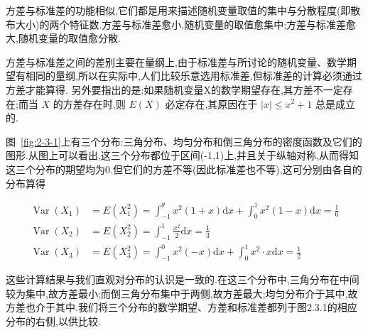 方差与标准差的功能相似,它们都是用来描述随机变量取值的集中与分散程度(即散布大小)的两个特征数.方差与标准差愈小,随机变量的取值愈集中;方差与标准差愈大,随机变量的取值愈分散.

方差与标准差之间的差别主要在量纲上,由于标准差与所讨论的随机变量、数学期望有相同的量纲,所以在实际中,人们比较乐意选用标准差,但标准差的计算必须通过方差才能算得.
另外要指出的是:如果随机变量X的数学期望存在,其方差不一定存在;而当 $ X $ 的方差存在时,则 $ E(X) $ 必定存在,其原因在于 $ |x| \leqslant x^{2}+1 $ 总是成立的.

\begin{example}
	图~\ref{fig:2-3-1}上有三个分布:三角分布、均匀分布和倒三角分布的密度函数及它们的图形.从图上可以看出,这三个分布都位于区间(-1,1)上,并且关于纵轴对称,从而得知这三个分布的期望均为0.但它们的方差不等(因此标准差也不等),这可分别由各自的分布算得
	
	\[
	\begin{aligned}
	\operatorname{Var}\left(X_{1}\right)&=E\left(X_{1}^{2}\right)=\int_{-1}^{\theta} x^{2}(1+x) \mathrm{d} x+\int_{0}^{1} x^{2}(1-x) \mathrm{d} x=\frac{1}{6}\\
	\operatorname{Var}\left(X_{2}\right) &=E\left(X_{2}^{2}\right)=\int_{-1}^{1} \frac{x^{2}}{2} \mathrm{d} x=\frac{1}{3} \\ 
	\operatorname{Var}\left(X_{3}\right) &=E\left(X_{3}^{2}\right)=\int_{-1}^{0} x^{2}(-x) \mathrm{d} x+\int_{0}^{1} x^{2} \cdot x \mathrm{d} x=\frac{1}{2} 
	\end{aligned}
	\]
	
	这些计算结果与我们直观对分布的认识是一致的.在这三个分布中,三角分布在中间较为集中,故方差最小;而倒三角分布集中于两侧,故方差最大;均匀分布介于其中,故方差也介于其中.我们将三个分布的数学期望、方差和标准差都列于图2.3.1的相应分布的右侧,以供比较.
	
\end{example}


